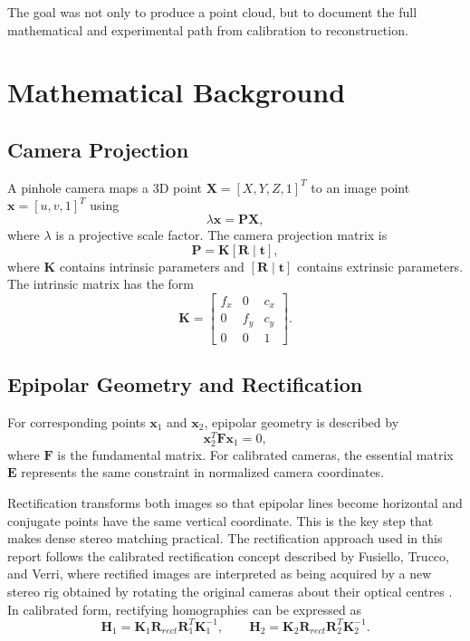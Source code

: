 \documentclass[11pt,a4paper]{article}
\newcommand{\mat}[1]{\mathbf{#1}}
\begin{document}
The goal was not only to produce a point cloud, but to document the full mathematical and experimental path from calibration to reconstruction.

\section{Mathematical Background}

\subsection{Camera Projection}

A pinhole camera maps a 3D point \(\mat{X}=[X,Y,Z,1]^T\) to an image point \(\mat{x}=[u,v,1]^T\) using
\begin{equation}
    \lambda \mat{x} = \mat{P}\mat{X},
\end{equation}
where \(\lambda\) is a projective scale factor. The camera projection matrix is
\begin{equation}
    \mat{P} = \mat{K}[\mat{R}\mid\mat{t}],
\end{equation}
where \(\mat{K}\) contains intrinsic parameters and \([\mat{R}\mid\mat{t}]\) contains extrinsic parameters. The intrinsic matrix has the form
\begin{equation}
\mat{K}=\begin{bmatrix}
    f_x & 0 & c_x \\
    0 & f_y & c_y \\
    0 & 0 & 1
\end{bmatrix}.
\end{equation}

\subsection{Epipolar Geometry and Rectification}

For corresponding points \(\mat{x}_1\) and \(\mat{x}_2\), epipolar geometry is described by
\begin{equation}
    \mat{x}_2^T \mat{F}\mat{x}_1 = 0,
\end{equation}
where \(\mat{F}\) is the fundamental matrix. For calibrated cameras, the essential matrix \(\mat{E}\) represents the same constraint in normalized camera coordinates.

Rectification transforms both images so that epipolar lines become horizontal and conjugate points have the same vertical coordinate. This is the key step that makes dense stereo matching practical. The rectification approach used in this report follows the calibrated rectification concept described by Fusiello, Trucco, and Verri, where rectified images are interpreted as being acquired by a new stereo rig obtained by rotating the original cameras about their optical centres \cite{fusiello2000compact,fusiello1998tutorial}. In calibrated form, rectifying homographies can be expressed as
\begin{equation}
    \mat{H}_1 = \mat{K}_1\mat{R}_{rect}\mat{R}_1^T\mat{K}_1^{-1},\qquad
    \mat{H}_2 = \mat{K}_2\mat{R}_{rect}\mat{R}_2^T\mat{K}_2^{-1}.
\end{equation}
\end{document}

